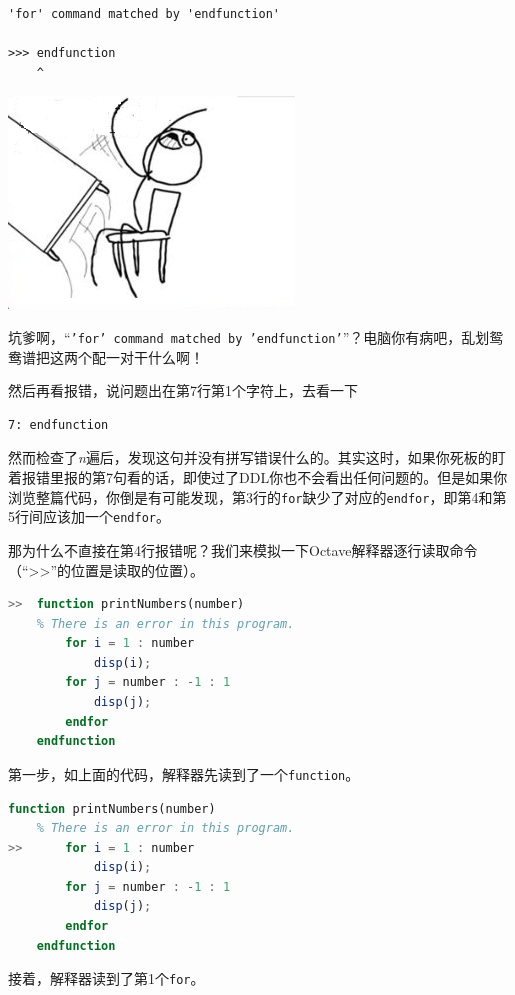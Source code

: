 \documentclass[12pt]{article}
\begin{document}
\begin{spacing}{1.4}
\begin{lstlisting}
'for' command matched by 'endfunction'
    
>>> endfunction
    ^
\end{lstlisting}

\includegraphics{throwDesk.png}

坑爹啊，“\texttt{'for' command matched by 'endfunction'}”？电脑你有病吧，乱划鸳鸯谱把这两个配一对干什么啊！

然后再看报错，说问题出在第7行第1个字符上，去看一下

\begin{lstlisting}
7: endfunction
\end{lstlisting}

然而检查了\textit{n}遍后，发现这句并没有拼写错误什么的。其实这时，如果你死板的盯着报错里报的第7句看的话，即使过了DDL你也不会看出任何问题的。但是如果你浏览整篇代码，你倒是有可能发现，第3行的\texttt{for}缺少了对应的\texttt{endfor}，即第4和第5行间应该加一个\texttt{endfor}。

那为什么不直接在第4行报错呢？我们来模拟一下Octave解释器逐行读取命令（“>>”的位置是读取的位置）。

\begin{lstlisting}[language=octave]
>>  function printNumbers(number)
    % There is an error in this program.
        for i = 1 : number
            disp(i);
        for j = number : -1 : 1
            disp(j);
        endfor
    endfunction
\end{lstlisting}

第一步，如上面的代码，解释器先读到了一个\texttt{function}。

\begin{lstlisting}[language=octave]
    function printNumbers(number)
    % There is an error in this program.
>>      for i = 1 : number
            disp(i);
        for j = number : -1 : 1
            disp(j);
        endfor
    endfunction
\end{lstlisting}

接着，解释器读到了第1个\texttt{for}。


\end{spacing}
\end{document}

